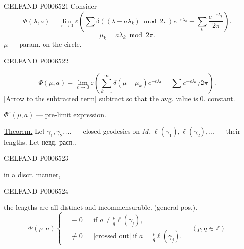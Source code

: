\begin{GelfandAdjacentEvidence}{GELFAND-P000652}{1}
Consider
\[
\Phi(\lambda,a)=\lim_{\varepsilon\to0}\varepsilon
\left(\sum\delta((\lambda-a\lambda_k)\bmod 2\pi)e^{-\varepsilon\lambda_k}
-\sum_k\frac{e^{-\varepsilon\lambda_k}}{2\pi}\right).
\]
\[
\mu_k=a\lambda_k\bmod 2\pi.
\]
\(\mu\) --- param. on the circle.
\end{GelfandAdjacentEvidence}
\begin{GelfandAdjacentEvidence}{GELFAND-P000652}{2}

\[
\Phi(\mu,a)=\lim_{\varepsilon\to0}\varepsilon
\left(\sum_{k=1}^{\infty}\delta(\mu-\mu_k)e^{-\varepsilon\lambda_k}
-\sum e^{-\varepsilon\lambda_k}/2\pi\right).
\]
[Arrow to the subtracted term] subtract so that the avg. value is \(0\). constant.

\(\Phi^\varepsilon(\mu,a)\) --- pre-limit expression.

\underline{Theorem.} Let \(\gamma_1,\gamma_2,\ldots\) --- closed geodesics on \(M\),
\(\ell(\gamma_1),\ell(\gamma_2),\ldots\) --- their lengths.
Let невд. расп.,
\end{GelfandAdjacentEvidence}
\begin{GelfandAdjacentEvidence}{GELFAND-P000652}{3}

in a discr. manner,
\end{GelfandAdjacentEvidence}
\begin{GelfandAdjacentEvidence}{GELFAND-P000652}{4}

the lengths are all distinct and incommensurable. (general pos.).
\[
\Phi(\mu,a)\left\{
\begin{aligned}
&\equiv0&&\text{if } a\ne\frac pq\ell(\gamma_j),\\
&\not\equiv0&&\text{[crossed out] if } a=\frac pq\ell(\gamma_j).
\end{aligned}
\right.
\quad(p,q\in\mathbb Z)
\]
\end{GelfandAdjacentEvidence}
